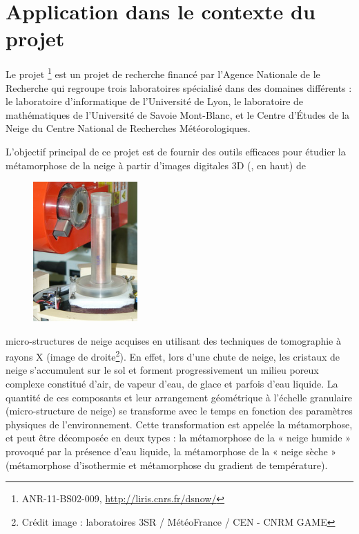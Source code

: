 %
\section{Application dans le contexte du projet \digitalSnow}%
\label{sec:applications:digitalsnow}
%
Le projet \digitalSnow\footnote{ANR-11-BS02-009,
\url{http://liris.cnrs.fr/dsnow/}} est un projet de recherche financé par
l'Agence Nationale de le Recherche qui regroupe trois laboratoires spécialisé
dans des domaines différents : le laboratoire d'informatique
\textsc{} de l'Université de Lyon, le laboratoire de
mathématiques \textsc{} de l'Université de Savoie Mont-Blanc, et
le Centre d'Études de la Neige \textsc{} du Centre National de
Recherches Météorologiques.


L'objectif principal de ce projet est de fournir des outils efficaces pour
étudier la métamorphose de la neige à partir d'images digitales 3D
(, en haut) de
%
\begin{figure}
	\includegraphics[width=4cm]{images/digitalSnow/YTEjpE}
\end{figure}
%
micro-structures de neige acquises en utilisant des techniques de tomographie à
rayons X (image de droite\footnote{Crédit image : laboratoires 3SR / MétéoFrance / CEN - CNRM GAME}). En effet,
lors d'une chute de neige, les cristaux de neige s'accumulent sur le sol et
forment progressivement un milieu poreux complexe constitué d'air, de vapeur
d'eau, de glace et parfois d'eau liquide. La quantité de ces composants et leur
arrangement géométrique à l'échelle granulaire (micro-structure de neige) se
transforme avec le temps en fonction des paramètres physiques de
l'environnement. Cette transformation est appelée la métamorphose, et peut être
décomposée en deux types : la métamorphose de la « neige humide » provoqué par
la présence d'eau liquide, la métamorphose de la « neige sèche » (métamorphose
d'isothermie et métamorphose du gradient de température).

